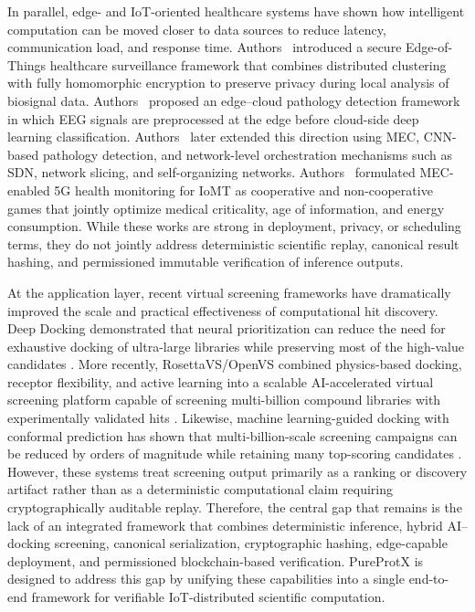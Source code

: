 \documentclass[conference]{IEEEtran}
\begin{document}
In parallel, edge- and IoT-oriented healthcare systems have shown how intelligent computation can be moved closer to data sources to reduce latency, communication load, and response time. Authors~\cite{alabdulatif2019secure} introduced a secure Edge-of-Things healthcare surveillance framework that combines distributed clustering with fully homomorphic encryption to preserve privacy during local analysis of biosignal data. Authors~\cite{muhammad2019computing} proposed an edge--cloud pathology detection framework in which EEG signals are preprocessed at the edge before cloud-side deep learning classification. Authors~ \cite{hossain2020deep} later extended this direction using MEC, CNN-based pathology detection, and network-level orchestration mechanisms such as SDN, network slicing, and self-organizing networks. Authors~\cite{ning2020mobile} formulated MEC-enabled 5G health monitoring for IoMT as cooperative and non-cooperative games that jointly optimize medical criticality, age of information, and energy consumption. While these works are strong in deployment, privacy, or scheduling terms, they do not jointly address deterministic scientific replay, canonical result hashing, and permissioned immutable verification of inference outputs.

At the application layer, recent virtual screening frameworks have dramatically improved the scale and practical effectiveness of computational hit discovery. Deep Docking demonstrated that neural prioritization can reduce the need for exhaustive docking of ultra-large libraries while preserving most of the high-value candidates \cite{gentile2022artificial}. More recently, RosettaVS/OpenVS combined physics-based docking, receptor flexibility, and active learning into a scalable AI-accelerated virtual screening platform capable of screening multi-billion compound libraries with experimentally validated hits \cite{zhou2024artificial}. Likewise, machine learning-guided docking with conformal prediction has shown that multi-billion-scale screening campaigns can be reduced by orders of magnitude while retaining many top-scoring candidates \cite{luttens2025rapid}. However, these systems treat screening output primarily as a ranking or discovery artifact rather than as a deterministic computational claim requiring cryptographically auditable replay. Therefore, the central gap that remains is the lack of an integrated framework that combines deterministic inference, hybrid AI--docking screening, canonical serialization, cryptographic hashing, edge-capable deployment, and permissioned blockchain-based verification. PureProtX is designed to address this gap by unifying these capabilities into a single end-to-end framework for verifiable IoT-distributed scientific computation.
\end{document}

